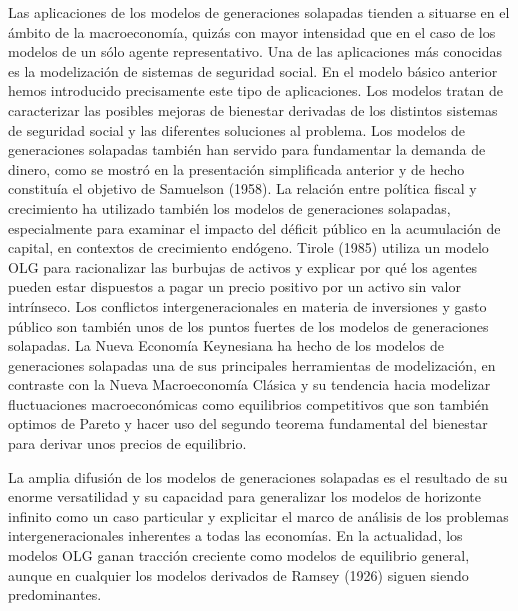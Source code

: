 \documentclass{nuevotema}
\begin{document}
Las aplicaciones de los modelos de generaciones solapadas tienden a situarse en el ámbito de la macroeconomía, quizás con mayor intensidad que en el caso de los modelos de un sólo agente representativo. Una de las aplicaciones más conocidas es la modelización de sistemas de seguridad social. En el modelo básico anterior hemos introducido precisamente este tipo de aplicaciones. Los modelos tratan de caracterizar las posibles mejoras de bienestar derivadas de los distintos sistemas de seguridad social y las diferentes soluciones al problema. Los modelos de generaciones solapadas también han servido para fundamentar la demanda de dinero, como se mostró en la presentación simplificada anterior y de hecho constituía el objetivo de Samuelson (1958). La relación entre política fiscal y crecimiento ha utilizado también los modelos de generaciones solapadas, especialmente para examinar el impacto del déficit público en la acumulación de capital, en contextos de crecimiento endógeno. Tirole (1985) utiliza un modelo OLG para racionalizar las burbujas de activos y explicar por qué los agentes pueden estar dispuestos a pagar un precio positivo por un activo sin valor intrínseco. Los conflictos intergeneracionales en materia de inversiones y gasto público son también unos de los puntos fuertes de los modelos de generaciones solapadas. La Nueva Economía Keynesiana ha hecho de los modelos de generaciones solapadas una de sus principales herramientas de modelización, en contraste con la Nueva Macroeconomía Clásica y su tendencia hacia modelizar fluctuaciones macroeconómicas como equilibrios competitivos que son también optimos de Pareto y hacer uso del segundo teorema fundamental del bienestar para derivar unos precios de equilibrio.

La amplia difusión de los modelos de generaciones solapadas es el resultado de su enorme versatilidad y su capacidad para generalizar los modelos de horizonte infinito como un caso particular y explicitar el marco de análisis de los problemas intergeneracionales inherentes a todas las economías. En la actualidad, los modelos OLG ganan tracción creciente como modelos de equilibrio general, aunque en cualquier los modelos derivados de Ramsey (1926) siguen siendo predominantes.
\end{document}
